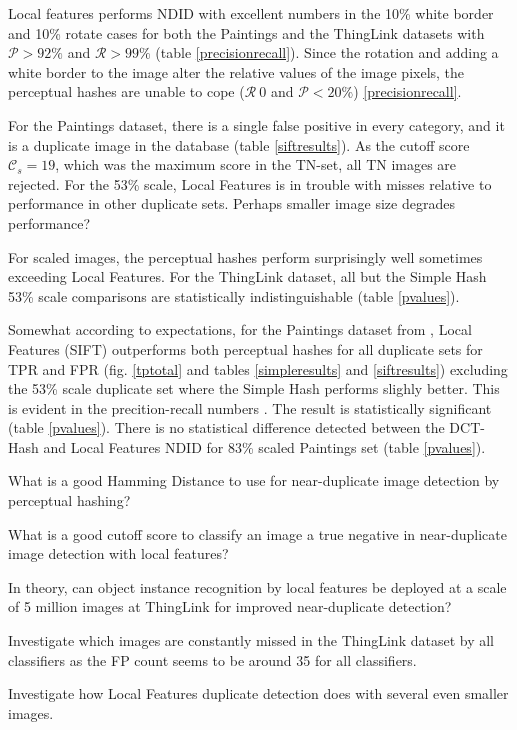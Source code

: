 \documentclass[english,12pt,a4paper,pdftex,elec,utf8, table]{aaltothesis}
\begin{document}
Local features performs NDID with excellent numbers in the 10\% white border and 10\% rotate cases for both the Paintings and the ThingLink datasets with $\mathcal{P} > 92\%$ and $\mathcal{R} > 99 \%$ (table \ref{precisionrecall}). Since the rotation and adding a white border to the image alter the relative values of the image pixels, the perceptual hashes are unable to cope ($\mathcal{R}~0$ and $\mathcal{P} < 20\%$) \ref{precisionrecall}.

For the Paintings dataset, there is a single false positive in every category, and it is a duplicate image in the database (table \ref{siftresults}). As the cutoff score $\mathcal{C}_s=19$, which was the maximum score in the TN-set, all TN images are rejected. For the 53\% scale, Local Features is in trouble with misses relative to performance in other duplicate sets. Perhaps smaller image size degrades performance?

For scaled images, the perceptual hashes perform surprisingly well sometimes exceeding Local Features. For the ThingLink dataset, all but the Simple Hash 53\% scale comparisons are statistically indistinguishable (table \ref{pvalues}).

Somewhat according to expectations, for the Paintings dataset from \cite{Vedaldi2012}, Local Features (SIFT) outperforms both perceptual hashes for all duplicate sets for TPR and FPR (fig. \ref{tptotal} and tables \ref{simpleresults} and \ref{siftresults}) excluding the 53\% scale duplicate set where the Simple Hash performs slighly better. This is evident in the precition-recall numbers . The result is statistically significant (table \ref{pvalues}). There is no statistical difference detected between the DCT-Hash and Local Features NDID for 83\% scaled Paintings set (table \ref{pvalues}).

What is a good Hamming Distance to use for near-duplicate image detection by perceptual hashing?

What is a good cutoff score to classify an image a true negative in near-duplicate image detection with local features?

In theory, can object instance recognition by local features be deployed at a scale of 5 million images at ThingLink for improved near-duplicate detection?

Investigate which images are constantly missed in the ThingLink dataset by all classifiers as the FP count seems to be around 35 for all classifiers.

Investigate how Local Features duplicate detection does with several even smaller images.
\end{document}
